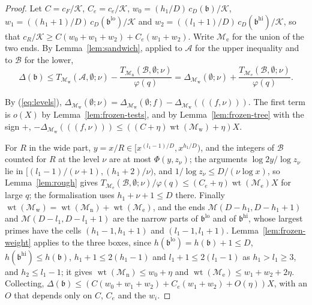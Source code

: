 \documentclass[11pt]{article}
\theoremstyle{definition}
\begin{document}
\begin{proof}
Let $C = c_F/\mathcal K$, $C_e = c_e/\mathcal K$, $w_0 = (h_1/D)\, c_D(\mathfrak b)/\mathcal K$, $w_1 = ((h_1 + 1)/D)\,
c_D(\mathfrak b^{\mathrm{lo}})/\mathcal K$ and $w_2 = ((l_1 + 1)/D)\, c_D(\mathfrak b^{\mathrm{hi}})/\mathcal K$, so
that
$c_R/\mathcal K \ge C(w_0 + w_1 + w_2) + C_e(w_1 + w_2)$. Write $\mathcal M_{\mathrm e}$ for the union of the two ends.
By
Lemma~\ref{lem:sandwich}, applied to $\mathcal A$ for the upper inequality and to $\mathcal B$ for the lower,
\[
  \Delta(\mathfrak b) \le T_{\mathcal M_{\mathrm w}}(\mathcal A, \emptyset; \nu) - \frac{T_{\mathcal M_{\mathrm
  n}}(\mathcal B, \emptyset; \nu)}{\varphi(q)} = \Delta_{\mathcal M_{\mathrm w}}(\emptyset; \nu) + \frac{T_{\mathcal
  M_{\mathrm e}}(\mathcal B, \emptyset; \nu)}{\varphi(q)}.
\]

By (\ref{eq:levels}), $\Delta_{\mathcal M_{\mathrm w}}(\emptyset; \nu) = \Delta_{\mathcal M_{\mathrm w}}(\emptyset; f) -
\Delta_{\mathcal M_{\mathrm w}}(((f, \nu)))$. The first term is $o(X)$ by Lemma~\ref{lem:frozen-tests}, and by
Lemma~\ref{lem:frozen-tree} with the sign $+$, $-\Delta_{\mathcal M_{\mathrm w}}(((f, \nu))) \le ((C +
\eta)\operatorname{wt}(\mathcal M_{\mathrm w}) + \eta)X$.

For $R$ in the wide part, $y = x/R \in [x^{(l_1 - 1)/D}, x^{h_1/D})$, and the integers of $\mathcal B$ counted for $R$ at
the level $\nu$ are at most $\Phi(y, z_\nu)$; the arguments $\log 2y/\log z_\nu$ lie in $[(l_1 - 1)/(\nu + 1), (h_1 +
2)/\nu)$, and $1/\log z_\nu \le D/(\nu \log x)$, so Lemma~\ref{lem:rough} gives $T_{\mathcal M_{\mathrm e}}(\mathcal B,
\emptyset; \nu)/\varphi(q) \le (C_e + \eta)\operatorname{wt}(\mathcal M_{\mathrm e}) X$ for large $q$; the
formalisation uses $h_1 + \nu + 1 \le D$ there. Finally
$\operatorname{wt}(\mathcal M_{\mathrm w}) = \operatorname{wt}(\mathcal M_{\mathrm n}) + \operatorname{wt}(\mathcal
M_{\mathrm e})$, and the ends $\mathcal M(D - h_1, D - h_1 + 1)$ and $\mathcal M(D - l_1, D - l_1 + 1)$ are the narrow
parts of $\mathfrak b^{\mathrm{lo}}$ and of $\mathfrak b^{\mathrm{hi}}$, whose largest primes have the cells $(h_1 - 1,
h_1 + 1)$ and $(l_1 - 1, l_1 + 1)$. Lemma~\ref{lem:frozen-weight} applies to the three
boxes, since $h(\mathfrak b^{\mathrm{lo}}) = h(\mathfrak b) + 1 \le D$, $h(\mathfrak b^{\mathrm{hi}}) \le h(\mathfrak
b)$,
$h_1 + 1 \le 2(h_1 - 1)$ and $l_1 + 1 \le 2(l_1 - 1)$ as $h_1 > l_1 \ge 3$, and $h_2 \le l_1 - 1$; it gives
$\operatorname{wt}(\mathcal M_{\mathrm n}) \le w_0 + \eta$ and $\operatorname{wt}(\mathcal M_{\mathrm e}) \le w_1 + w_2
+ 2\eta$. Collecting, $\Delta(\mathfrak b) \le (C(w_0 + w_1 + w_2) + C_e(w_1 + w_2) + O(\eta))X$, with an $O$ that
depends only on $C$, $C_e$ and the $w_i$.
\end{proof}
\end{document}
